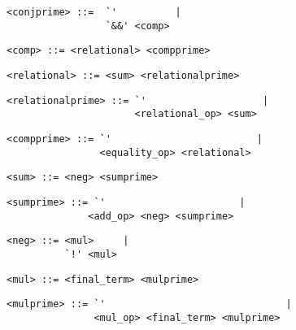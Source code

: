 \begin{footnotesize}
\begin{lstlisting}[frame=single, label={conjprime}, language=pie]
<conjprime> ::=  `'          |
                 `&&' <comp>
\end{lstlisting}

\begin{lstlisting}[frame=single, label={comp}, language=pie]
<comp> ::= <relational> <compprime>
\end{lstlisting}

\begin{lstlisting}[frame=single, label={relational}, language=pie]
<relational> ::= <sum> <relationalprime>
\end{lstlisting}

\begin{lstlisting}[frame=single, label={relationalprime}, language=pie]
<relationalprime> ::= `'                    |
                      <relational_op> <sum>
\end{lstlisting}

\begin{lstlisting}[frame=single, label={compprime}, language=pie]
<compprime> ::= `'                         |
                <equality_op> <relational>
\end{lstlisting}

\begin{lstlisting}[frame=single, label={sum}, language=pie]
<sum> ::= <neg> <sumprime>
\end{lstlisting}

\begin{lstlisting}[frame=single, label={sumprime}, language=pie]
<sumprime> ::= `'                       |
              <add_op> <neg> <sumprime>
\end{lstlisting}

\begin{lstlisting}[frame=single, label={neg}, language=pie]
<neg> ::= <mul>     |
          `!' <mul>
\end{lstlisting}

\begin{lstlisting}[frame=single, label={mul}, language=pie]
<mul> ::= <final_term> <mulprime>
\end{lstlisting}

\begin{lstlisting}[frame=single, label={mulprime}, language=pie]
<mulprime> ::= `'                               |
               <mul_op> <final_term> <mulprime>
\end{lstlisting}


\end{footnotesize}
